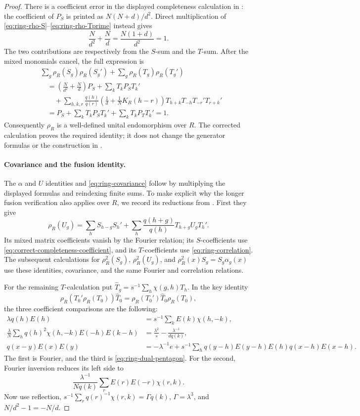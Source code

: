\documentclass[11pt]{article}
\theoremstyle{remark}
\begin{document}
\begin{proof}
There is a coefficient error in the displayed completeness calculation in
\cite[Appendix~B.1, printed p.~30]{RW2}: the coefficient of $P_S$ is
printed as $N(N+d)/d^2$. Direct multiplication of
\eqref{eq:ring-rho-S}--\eqref{eq:ring-rho-Tprime} instead gives
\begin{equation}\label{eq:correct-completeness-coefficient}
 \frac N{d^2}+\frac Nd=\frac{N(1+d)}{d^2}=1.
\end{equation}
The two contributions are respectively from the $S$-sum and the $T$-sum.
After the mixed monomials cancel, the full expression is
\begin{align*}
 &\sum_g\rho_R(S_g)\rho_R(S_g')+\sum_g\rho_R(T_g)\rho_R(T_g')\\
 &\quad=\left(\frac N{d^2}+\frac Nd\right)P_S
      +\sum_kT_kP_ST_k'\\
 &\qquad+\sum_{h,k,r}\frac{q(h)}{q(r)}
       \left(\frac1d+\frac1NK_R(h-r)\right)
       T_{h+k}T_{-h}T_{-r}'T_{r+k}'\\
 &\quad=P_S+\sum_kT_kP_ST_k'+\sum_kT_kP_TT_k'=1.
\end{align*}
Consequently $\rho_R$ is a well-defined unital endomorphism over $R$.
The corrected calculation proves the required identity; it does not change
the generator formulas or the construction in \cite{RW2}.

\paragraph{Covariance and the fusion identity.}
The $\alpha$ and $U$ identities and \eqref{eq:ring-covariance} follow by
multiplying the displayed formulas and reindexing finite sums. To make
explicit why the longer fusion verification also applies over $R$, we
record its reductions from \cite[Appendix~B.2]{RW2}. First they give
\[
 \rho_R(U_g)=\sum_hS_{h-g}S_h'
        +\sum_h\frac{q(h+g)}{q(h)}T_{h+g}U_gT_h'.
\]
Its mixed matrix coefficients vanish by the Fourier relation; its
$S$-coefficients use \eqref{eq:correct-completeness-coefficient}, and its
$T$-coefficients use \eqref{eq:ring-correlation}. The subsequent
calculations for $\rho_R^2(S_g)$, $\rho_R^2(U_g)$, and
$\rho_R^2(x)S_g=S_g\alpha_g(x)$ use these identities, covariance, and
the same Fourier and correlation relations.

For the remaining $T$-calculation put
$\widehat T_g=s^{-1}\sum_h\chi(g,h)T_h$. In the key identity
\[
 \rho_R(T_0'\rho_R(T_0))\widehat T_0
       =\rho_R(T_0')\widehat T_0\rho_R(T_0),
\]
the three coefficient comparisons are the following:
\begin{align*}
 \lambda q(h)E(h)&=s^{-1}\sum_kE(k)\chi(h,-k),\\
 \frac\lambda N\sum_hq(h)^2\chi(h,-k)E(-h)E(k-h)
     &=\frac{\lambda^2}s-\frac{\lambda^{-1}}{dq(k)},\\
 q(x-y)E(x)E(y)&=-\lambda^{-1}e+
     s^{-1}\sum_hq(y-h)E(y-h)E(h)q(x-h)E(x-h).
\end{align*}
The first is Fourier, and the third is \eqref{eq:ring-dual-pentagon}.
For the second, Fourier inversion reduces its left side to
\[
 \frac{\lambda^{-1}}{Nq(k)}\sum_rE(r)E(-r)\chi(r,k).
\]
Now use reflection,
$s^{-1}\sum_rq(r)^{-1}\chi(r,k)=\Gamma q(k)$,
$\Gamma=\lambda^3$, and $N/d^2-1=-N/d$.


\end{proof}
\end{document}
